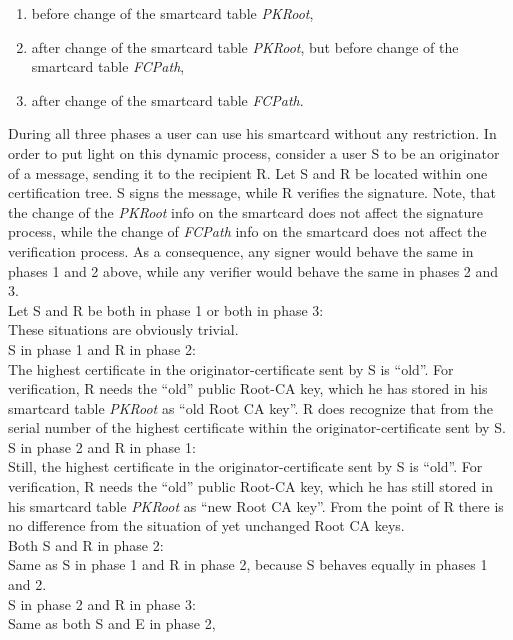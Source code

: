\begin{enumerate}
\item before change of the smartcard table {\em PKRoot},
\item after change of the smartcard table {\em PKRoot},
but before change of the smartcard table {\em FCPath},
\item after change of the smartcard table {\em FCPath}.
\end{enumerate}

During all three phases a user can use his smartcard without
any restriction. In order to put light on this dynamic process,
consider a user S to be an originator of a message,
sending it to the recipient R.
Let S and R be located within one certification tree.
S signs the message, while R verifies the signature.
Note, that the change of the {\em PKRoot} info on the smartcard
does not affect the signature process,
while the change of {\em FCPath} info on the smartcard does not
affect the verification process.
As a consequence, any signer would behave the same in phases 1 and 2 above,
while any verifier would behave the same in phases 2 and 3.
\\[1ex]
Let S and R be both in phase 1 or both in phase 3:
\\[1ex]
These situations are obviously trivial.
\\[1ex]
S in phase 1 and R in phase 2:
\\[1ex]
The highest certificate in the originator-certificate sent by S is ``old''.
For verification,
R needs the ``old'' public Root-CA key, which he has stored
in his smartcard table {\em PKRoot} as ``old Root CA key''.
R does recognize that from the serial number of the highest certificate
within the originator-certificate sent by S.
\\[1ex]
S in phase 2 and R in phase 1:
\\[1ex]
Still,
the highest certificate in the originator-certificate sent by S is ``old''.
For verification,
R needs the ``old'' public Root-CA key, which he has still stored
in his smartcard table {\em PKRoot} as ``new Root CA key''.
From the point of R there is no difference from the situation of
yet unchanged Root CA keys.
\\[1ex]
Both S and R in phase 2:
\\[1ex]
Same as S in phase 1 and R in phase 2,
because S behaves equally in phases 1 and 2.
\\[1ex]
S in phase 2 and R in phase 3:
\\[1ex]
Same as both S and E in phase 2,
